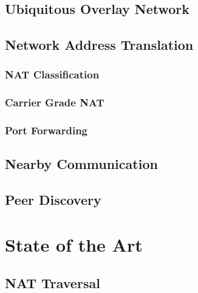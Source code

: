\section{Ubiquitous Overlay Network}



\section{Network Address Translation}

\subsection{NAT Classification}

\subsection{Carrier Grade NAT}

\subsection{Port Forwarding}


\section{Nearby Communication}


\section{Peer Discovery}


\chapter{State of the Art}

\section{NAT Traversal}

